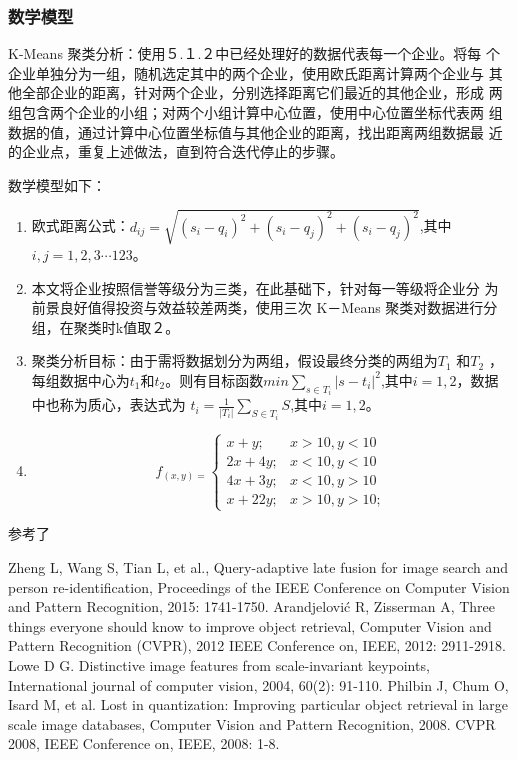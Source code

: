 \documentclass{article}
\begin{document}
\subsubsection{数学模型}
K-Means 聚类分析：使用５.１.２中已经处理好的数据代表每一个企业。将每
个企业单独分为一组，随机选定其中的两个企业，使用欧氏距离计算两个企业与
其他全部企业的距离，针对两个企业，分别选择距离它们最近的其他企业，形成
两组包含两个企业的小组；对两个小组计算中心位置，使用中心位置坐标代表两
组数据的值，通过计算中心位置坐标值与其他企业的距离，找出距离两组数据最
近的企业点，重复上述做法，直到符合迭代停止的步骤。\par
数学模型如下：
\begin{enumerate}[i]
    \item 欧式距离公式：$ d_{ij} = \sqrt{(s_i-q_i)^2+(s_i-q_j)^2+(s_i-q_j)^2}$,其中$ i,j = 1,2,3\cdots123$。
    \item  本文将企业按照信誉等级分为三类，在此基础下，针对每一等级将企业分
    为前景良好值得投资与效益较差两类，使用三次 K－Means 聚类对数据进行分
    组，在聚类时k值取２。
    \item 聚类分析目标：由于需将数据划分为两组，假设最终分类的两组为$T_1$ 和$T_2$ ，
    每组数据中心为$t_1$和$t_2$。则有目标函数$min\sum_{s\in T_i}|s-t_i|^2$,其中$i =1,2$，数据中也称为质心，表达式为
    $t_i = \frac{1}{|T_i|}\sum_{S\in T_i} S$,其中$i = 1,2$。
    \item \[f_{(x,y) = }
    \begin{cases}
        x + y; & x > 10,y < 10\\
        2x + 4y; & x < 10, y < 10\\
        4x + 3y; & x < 10 ,y > 10 \\
        x + 22y; & x > 10,y > 10;
    \end{cases}\]
\end{enumerate}
    参考了\cite{ref1}
\begin{thebibliography}{99}  
    Zheng L, Wang S, Tian L, et al., Query-adaptive late fusion for image search and person re-identification, Proceedings of the IEEE Conference on Computer Vision and Pattern Recognition, 2015: 1741-1750.  
    Arandjelović R, Zisserman A, Three things everyone should know to improve object retrieval, Computer Vision and Pattern Recognition (CVPR), 2012 IEEE Conference on, IEEE, 2012: 2911-2918.  
    Lowe D G. Distinctive image features from scale-invariant keypoints, International journal of computer vision, 2004, 60(2): 91-110.  
    Philbin J, Chum O, Isard M, et al. Lost in quantization: Improving particular object retrieval in large scale image databases, Computer Vision and Pattern Recognition, 2008. CVPR 2008, IEEE Conference on, IEEE, 2008: 1-8.  
    \end{thebibliography}
\end{document}
